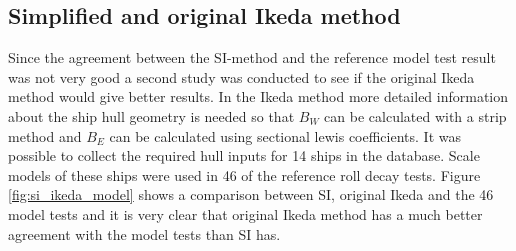 \subsection{Simplified and original Ikeda method}
\label{se:si_ikeda_model}
Since the agreement between the SI-method and the reference model test result was not very good a second study was conducted to see if the original Ikeda method would give better results. In the Ikeda method more detailed information about the ship hull geometry is needed so that $B_W$ can be calculated with a strip method and $B_E$ can be calculated using sectional lewis coefficients. It was possible to collect the required hull inputs for 14 ships in the database. Scale models of these ships were used in 46 of the reference roll decay tests.
Figure \ref{fig:si_ikeda_model} shows a comparison between SI, original Ikeda and the 46 model tests and it is very clear that original Ikeda method has a much better agreement with the model tests than SI has.  



